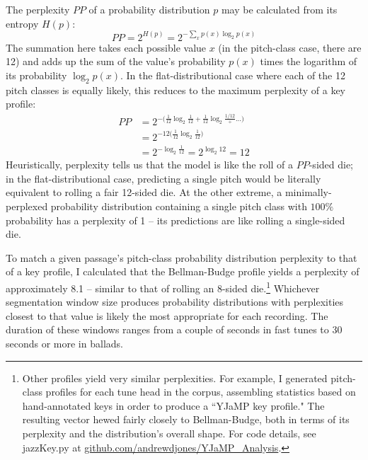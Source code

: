 The perplexity $PP$ of a probability distribution $p$ may be calculated from its entropy $H(p)$:
\begin{equation}
PP = 2^{H(p)} = 2^{-\sum_{x} p(x) \log_2 p(x)}
\end{equation}
The summation here takes each possible value $x$ (in the pitch-class case, there are 12) and adds up the sum of the value's probability $p(x)$ times the logarithm of its probability $\log_2 p(x)$.  In the flat-distributional case where each of the 12 pitch classes is equally likely, this reduces to the maximum perplexity of a key profile:
\begin{align*}
PP &= 2^{-\big(\frac{1}{12} \log_2 \frac{1}{12} + \frac{1}{12} \log_2 \frac{1/12} + ...\big)} \\
 &= 2^{-12\big(\frac{1}{12} \log_2 \frac{1}{12}\big)} \\
 &= 2^{-\log_2 \frac{1}{12}} = 2^{\log_2 12} = 12
\end{align*}
Heuristically, perplexity tells us that the model is like the roll of a $PP$-sided die; in the flat-distributional case, predicting a single pitch would be literally equivalent to rolling a fair 12-sided die.  At the other extreme, a minimally-perplexed probability distribution containing a single pitch class with $100\%$ probability has a perplexity of 1 -- its predictions are like rolling a single-sided die.

To match a given passage's pitch-class probability distribution perplexity to that of a key profile, I calculated that the Bellman-Budge profile yields a perplexity of approximately 8.1 -- similar to that of rolling an 8-sided die.\footnote{Other profiles yield very similar perplexities.  For example, I generated pitch-class profiles for each tune head in the corpus, assembling statistics based on hand-annotated keys in order to produce a ``YJaMP key profile."  The resulting vector hewed fairly closely to Bellman-Budge, both in terms of its perplexity and the distribution's overall shape.  For code details, see jazzKey.py at \href{github.com/andrewdjones/YJaMP_Analysis}{github.com/andrewdjones/YJaMP\_Analysis}.}  Whichever segmentation window size produces probability distributions with perplexities closest to that value is likely the most appropriate for each recording.  The duration of these windows ranges from a couple of seconds in fast tunes to 30 seconds or more in ballads.

